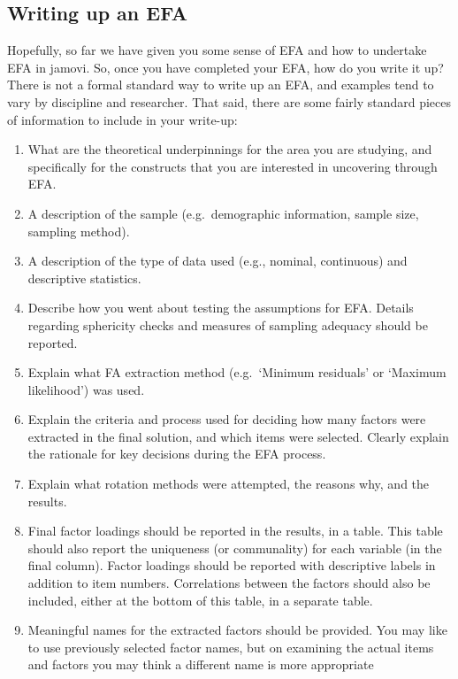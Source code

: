 \documentclass[
  a4paper,
]{book}
\begin{document}
\hypertarget{writing-up-an-efa}{%
\subsection{Writing up an EFA}\label{writing-up-an-efa}}

Hopefully, so far we have given you some sense of EFA and how to
undertake EFA in jamovi. So, once you have completed your EFA, how do
you write it up? There is not a formal standard way to write up an EFA,
and examples tend to vary by discipline and researcher. That said, there
are some fairly standard pieces of information to include in your
write-up:

\begin{enumerate}
\def\labelenumi{\arabic{enumi}.}
\item
  What are the theoretical underpinnings for the area you are studying,
  and specifically for the constructs that you are interested in
  uncovering through EFA.
\item
  A description of the sample (e.g.~demographic information, sample
  size, sampling method).
\item
  A description of the type of data used (e.g., nominal, continuous) and
  descriptive statistics.
\item
  Describe how you went about testing the assumptions for EFA. Details
  regarding sphericity checks and measures of sampling adequacy should
  be reported.
\item
  Explain what FA extraction method (e.g.~`Minimum residuals' or
  `Maximum likelihood') was used.
\item
  Explain the criteria and process used for deciding how many factors
  were extracted in the final solution, and which items were selected.
  Clearly explain the rationale for key decisions during the EFA
  process.
\item
  Explain what rotation methods were attempted, the reasons why, and the
  results.
\item
  Final factor loadings should be reported in the results, in a table.
  This table should also report the uniqueness (or communality) for each
  variable (in the final column). Factor loadings should be reported
  with descriptive labels in addition to item numbers. Correlations
  between the factors should also be included, either at the bottom of
  this table, in a separate table.
\item
  Meaningful names for the extracted factors should be provided. You may
  like to use previously selected factor names, but on examining the
  actual items and factors you may think a different name is more
  appropriate
\end{enumerate}
\end{document}
